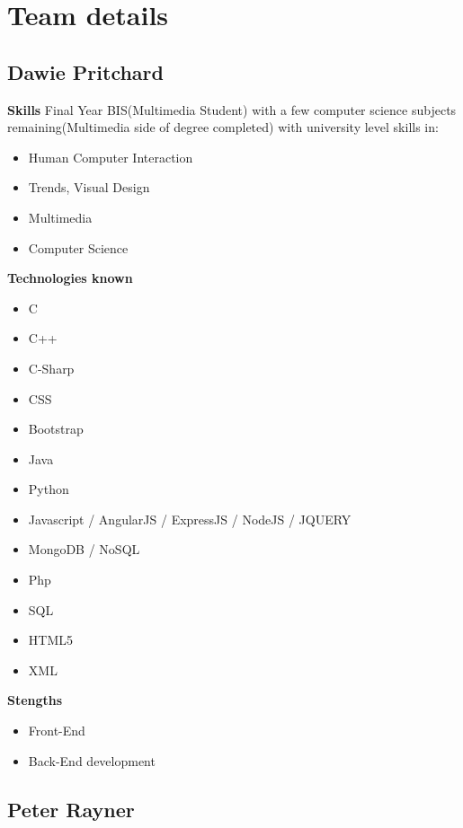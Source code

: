 \documentclass{article}
\begin{document}
\section{Team details}
\subsection{Dawie Pritchard}
\textbf{Skills}
Final Year BIS(Multimedia Student) with a few computer science subjects remaining(Multimedia side of degree completed) with  university level skills in:
\begin{itemize}
 	\item Human Computer Interaction
 	\item Trends, Visual Design 
 	\item Multimedia
 	\item Computer Science
\end {itemize}
\textbf{Technologies known}
\begin{itemize}
	\item C
 	\item C++
 	\item C-Sharp
 	\item CSS
 	\item Bootstrap
 	\item Java
 	\item Python
 	\item Javascript / AngularJS / ExpressJS / NodeJS / JQUERY
 	\item MongoDB / NoSQL
 	\item Php
 	\item SQL
 	\item HTML5
 	\item XML
 \end{itemize}
\textbf{Stengths} 
\begin{itemize}
	\item Front-End
	\item Back-End development
\end{itemize}

\subsection {Peter Rayner}
\end{document}
